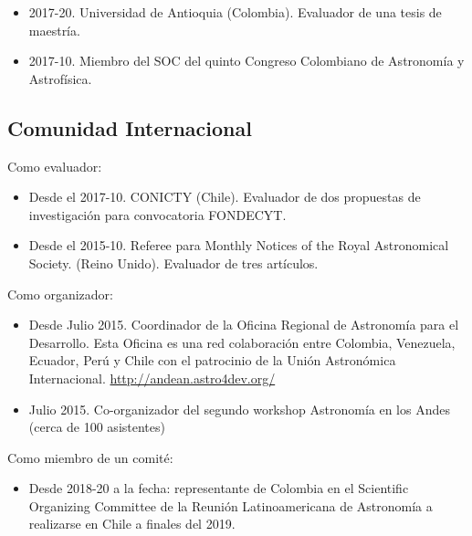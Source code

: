 \documentclass{article}
\begin{document}
\begin{itemize}
\item 2017-20. Universidad de Antioquia (Colombia). Evaluador de una tesis de
  maestr\'ia.  
\item 2017-10. Miembro del SOC del quinto Congreso Colombiano de Astronom\'ia y
  Astrof\'isica.
\end{itemize}


\subsection{Comunidad Internacional}

Como evaluador:
\begin{itemize}
\item Desde el 2017-10. CONICTY (Chile). Evaluador de dos propuestas de
  investigaci\'on para convocatoria FONDECYT.
\item Desde el 2015-10. Referee para Monthly Notices of the Royal
  Astronomical Society. (Reino Unido). Evaluador de tres art\'iculos.
\end{itemize}


Como organizador:
\begin{itemize}
\item {Desde Julio 2015. Coordinador de la Oficina Regional de
  Astronom\'ia para el Desarrollo. Esta Oficina es una red
  colaboraci\'on entre Colombia, Venezuela, Ecuador, Per\'u y Chile
  con el patrocinio de la Uni\'on Astron\'omica Internacional. 
\url{http://andean.astro4dev.org/}}    
\item {Julio 2015. Co-organizador del segundo workshop Astronom\'ia en los Andes
  (cerca de 100 asistentes)}
\end{itemize}

Como miembro de un comit\'e:
\begin{itemize}
\item Desde 2018-20 a la fecha: representante de Colombia en el
  Scientific Organizing Committee de la Reuni\'on Latinoamericana de
  Astronom\'ia a realizarse en Chile a finales del 2019.
\end{itemize}
\end{document}
